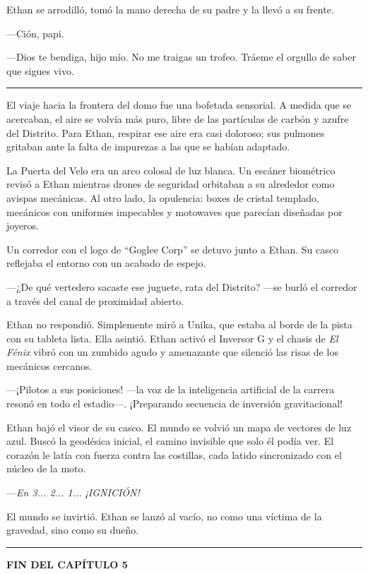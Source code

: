 \documentclass[12pt,a4paper]{book}
\begin{document}
Ethan se arrodilló, tomó la mano derecha de su padre y la llevó a su frente.

---Ción, papi.

---Dios te bendiga, hijo mío. No me traigas un trofeo. Tráeme el orgullo de saber que sigues vivo.

\bigskip
\noindent\rule{\textwidth}{0.4pt}
\bigskip

El viaje hacia la frontera del domo fue una bofetada sensorial. A medida que se acercaban, el aire se volvía más puro, libre de las partículas de carbón y azufre del Distrito. Para Ethan, respirar ese aire era casi doloroso; sus pulmones gritaban ante la falta de impurezas a las que se habían adaptado.

La Puerta del Velo era un arco colosal de luz blanca. Un escáner biométrico revisó a Ethan mientras drones de seguridad orbitaban a su alrededor como avispas mecánicas. Al otro lado, la opulencia: boxes de cristal templado, mecánicos con uniformes impecables y motowaves que parecían diseñadas por joyeros.

Un corredor con el logo de ``Goglee Corp'' se detuvo junto a Ethan. Su casco reflejaba el entorno con un acabado de espejo.

---¿De qué vertedero sacaste ese juguete, rata del Distrito? ---se burló el corredor a través del canal de proximidad abierto.

Ethan no respondió. Simplemente miró a Unika, que estaba al borde de la pista con su tableta lista. Ella asintió. Ethan activó el Inversor G y el chasis de \textit{El Fénix} vibró con un zumbido agudo y amenazante que silenció las risas de los mecánicos cercanos.

---¡Pilotos a sus posiciones! ---la voz de la inteligencia artificial de la carrera resonó en todo el estadio---. ¡Preparando secuencia de inversión gravitacional!

Ethan bajó el visor de su casco. El mundo se volvió un mapa de vectores de luz azul. Buscó la geodésica inicial, el camino invisible que solo él podía ver. El corazón le latía con fuerza contra las costillas, cada latido sincronizado con el núcleo de la moto.

---\textit{En 3... 2... 1... ¡IGNICIÓN!}

El mundo se invirtió. Ethan se lanzó al vacío, no como una víctima de la gravedad, sino como su dueño.

\bigskip
\noindent\rule{\textwidth}{0.4pt}
\bigskip

\textbf{FIN DEL CAPÍTULO 5}
\end{document}
